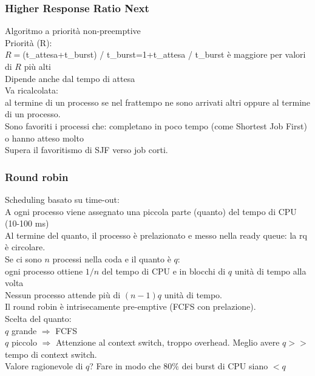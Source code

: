 \documentclass{article}
\begin{document}
\subsubsection*{Higher Response Ratio Next}
Algoritmo a priorit\`{a} non-preemptive\\
Priorit\`{a} (R):\\
$R=$(t\_attesa+t\_burst) / t\_burst=1+t\_attesa / t\_burst \`{e} maggiore per valori di $R$ pi\`{u} alti\\
Dipende anche dal tempo di attesa\\
Va ricalcolata:\\
al termine di un processo se nel frattempo ne sono arrivati altri oppure
al termine di un processo.\\
Sono favoriti i processi che: completano in poco tempo (come Shortest Job First) o hanno atteso molto\\
Supera il favoritismo di SJF verso job corti.\\
\subsubsection*{Round robin}
Scheduling basato su time-out:\\
A ogni processo viene assegnato una piccola parte (quanto) del tempo di CPU (10-100 ms)\\
Al termine del quanto, il processo \`{e} prelazionato e messo nella ready queue: la rq \`{e} circolare.\\
Se ci sono $n$ processi nella coda e il quanto \`{e} $q$:\\
ogni processo ottiene $1/n$ del tempo di CPU e in blocchi di $q$ unit\`{a} di tempo alla volta\\
Nessun processo attende pi\`{u} di $(n-1)q$ unit\`{a} di tempo.\\
Il round robin \`{e} intrisecamente pre-emptive (FCFS con prelazione).\\
Scelta del quanto:\\
$q$ grande $\Rightarrow$ FCFS\\
$q$ piccolo $\Rightarrow$ Attenzione al context switch, troppo overhead. Meglio avere
$q>> $tempo di context switch.\\
Valore ragionevole di $q$? Fare in modo che $80\%$ dei burst di CPU siano $<q$\\
\end{document}
